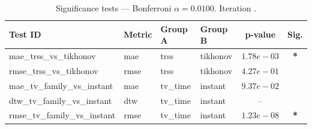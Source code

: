 ﻿%
\begin{table}[ht]
\centering
\caption[EEG reconstruction - Iteration it07b]{Significance tests — Bonferroni $\alpha=0.0100$. Iteration .}
\label{tab:sig_it07b_knn_3syn}
\small
\begin{tabular}{llllcc}
\toprule
Test ID & Metric & Group A & Group B & p-value & Sig. \\
\midrule
mae\_trss\_vs\_tikhonov & mae & trss & tikhonov & $1.78e-03$ & \textbf{*} \\
rmse\_trss\_vs\_tikhonov & rmse & trss & tikhonov & $4.27e-01$ &  \\
mae\_tv\_family\_vs\_instant & mae & tv\_time & instant & $9.37e-02$ &  \\
dtw\_tv\_family\_vs\_instant & dtw & tv\_time & instant & -- &  \\
rmse\_tv\_family\_vs\_instant & rmse & tv\_time & instant & $1.23e-08$ & \textbf{*} \\
\bottomrule
\end{tabular}
\end{table}







